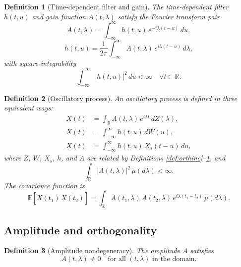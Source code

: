 \documentclass[12pt]{article}
\theoremstyle{plain}
\newtheorem{definition}{Definition}
\begin{document}
\begin{definition}[Time-dependent filter and gain]\label{def:filter-gain}
The time-dependent filter $h(t,u)$ and gain function $A(t,\lambda)$ satisfy the Fourier transform pair
\begin{equation}\label{eq:gain-from-filter}
A(t,\lambda) = \int_{-\infty}^\infty h(t,u) \, e^{-i\lambda(t-u)} \, du,
\end{equation}
\begin{equation}\label{eq:filter-from-gain}
h(t,u) = \frac{1}{2\pi} \int_{-\infty}^\infty A(t,\lambda) \, e^{i\lambda(t-u)} \, d\lambda,
\end{equation}
with square-integrability
\begin{equation}
\int_{-\infty}^\infty |h(t,u)|^2 \, du < \infty \quad \forall t \in \mathbb{R}.
\end{equation}
\end{definition}

\begin{definition}[Oscillatory process]\label{def:oscproc}
An oscillatory process is defined in three equivalent ways:
\begin{align}
X(t) &= \int_{\mathbb{R}} A(t,\lambda)\,e^{i\lambda t}\,dZ(\lambda),\label{eq:osc-spectral}\\
X(t) &= \int_{-\infty}^\infty h(t,u) \, dW(u),\label{eq:osc-filter}\\
X(t) &= \int_{-\infty}^\infty h(t,u) \, X_s(t-u) \, du,\label{eq:osc-convolution}
\end{align}
where $Z$, $W$, $X_s$, $h$, and $A$ are related by Definitions \ref{def:orthinc}--\ref{def:filter-gain}, and
\begin{equation}\label{eq:Atlambda-L2-mu}
\int_{\mathbb{R}} |A(t,\lambda)|^2\,\mu(d\lambda) < \infty.
\end{equation}
The covariance function is
\begin{equation}\label{eq:covariance}
\mathbb{E}[X(t_1)\,\overline{X(t_2)}] =
\int_{\mathbb{R}} A(t_1,\lambda)\,\overline{A(t_2,\lambda)}\,e^{i\lambda(t_1-t_2)}\,\mu(d\lambda).
\end{equation}
\end{definition}

\subsection{Amplitude and orthogonality}
\begin{definition}[Amplitude nondegeneracy]\label{def:nondeg}
The amplitude $A$ satisfies
\begin{equation}\label{eq:nonzero}
A(t,\lambda)\neq 0 \quad\text{for all $(t,\lambda)$ in the domain.}
\end{equation}
\end{definition}
\end{document}
